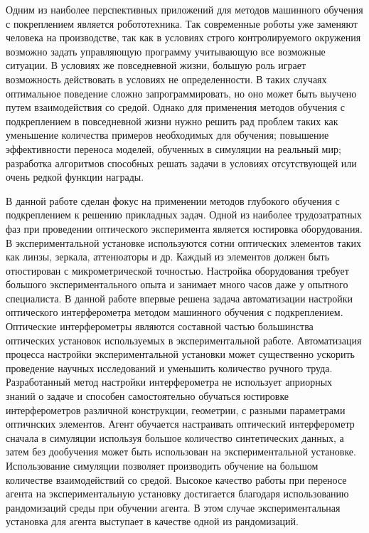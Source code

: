 Одним из наиболее перспективных приложений для методов машинного обучения с покреплением является робототехника. Так современные роботы уже заменяют человека на производстве, так как в условиях строго контролируемого окружения возможно задать управляющую программу учитывающую все возможные ситуации. В условиях же повседневной жизни, большую роль играет возможность действовать в условиях не определенности. В таких случаях оптимальное поведение сложно запрограммировать, но оно может быть выучено путем взаимодействия со средой. 
Однако для применения методов обучения с подкреплением в повседневной жизни нужно решить рад проблем таких как уменьшение количества примеров необходимых для обучения; повышение эффективности переноса моделей, обученных в симуляции на реальный мир; разработка алгоритмов способных решать задачи в условиях отсутствующей или очень редкой функции награды. 

В данной работе сделан фокус на применении методов глубокого обучения с подкреплением к решению прикладных задач. Одной из наиболее трудозатратных фаз при проведении оптического эксперимента является юстировка оборудования. В экспериментальной установке используются сотни оптических элементов таких как линзы, зеркала, аттенюаторы и др. Каждый из элементов должен быть отюстирован с микрометрической точностью. Настройка оборудования требует большого экспериментального опыта и занимает много часов даже у опытного специалиста. В данной работе впервые решена задача автоматизации настройки оптического интерферометра методом машинного обучения с подкреплением. Оптические интерферометры являются составной частью большинства оптических установок используемых в экспериментальной работе. Автоматизация процесса настройки экспериментальной установки может существенно ускорить проведение научных исследований и уменьшить количество ручного труда. Разработанный метод настройки интерферометра не использует априорных знаний о задаче и способен самостоятельно обучаться юстировке интерферометров различной конструкции, геометрии, с разными параметрами оптичнских элементов. Агент обучается настраивать оптический интерферометр сначала в симуляции используя большое количество синтетических данных, а затем без дообучения может быть использован на экспериментальной установке. Использование симуляции позволяет производить обучение на большом количестве взаимодействий со средой. Высокое качество работы при переносе агента на экспериментальную установку достигается благодаря использованию рандомизаций среды при обучении агента. В этом случае экспериментальная установка для агента выступает в качестве одной из рандомизаций. 

